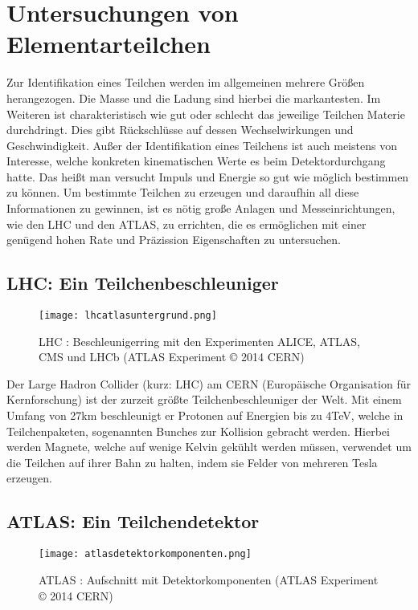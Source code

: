 \documentclass[
a4paper,                                %
twoside,                                %
BCOR1.4cm,                      %
ngerman,                                %
10pt,                           %
headings=normal,                %
headsepline,                    %
clearplainpage, %
final,                                  %
div=14,
parskip=full
]{scrbook}
\begin{document}
\newpage

\chapter{Untersuchungen von Elementarteilchen}

Zur Identifikation eines Teilchen werden im allgemeinen mehrere Gr\"o\ss en herangezogen. Die Masse und die Ladung sind hierbei die markantesten. Im Weiteren ist charakteristisch wie gut oder schlecht das jeweilige Teilchen Materie durchdringt. Dies gibt R\"uckschl\"usse auf dessen Wechselwirkungen und Geschwindigkeit.
Au\ss er der Identifikation eines Teilchens ist auch meistens von Interesse, welche konkreten kinematischen Werte es beim Detektordurchgang hatte. Das hei\ss t man versucht Impuls und Energie so gut wie m\"oglich bestimmen zu k\"onnen. 
Um bestimmte Teilchen zu erzeugen und daraufhin all diese Informationen zu gewinnen, ist es n\"otig gro\ss e Anlagen und Messeinrichtungen, wie den LHC und den ATLAS, zu errichten, die es erm\"oglichen mit einer gen\"ugend hohen Rate und Pr\"azission Eigenschaften zu untersuchen.

\section{LHC: Ein Teilchenbeschleuniger}

\begin{figure}[h]
	\texttt{[image: lhcatlasuntergrund.png]}
	\caption{LHC : Beschleunigerring mit den Experimenten ALICE, ATLAS, CMS und LHCb (ATLAS Experiment © 2014 CERN)}
\end{figure}

Der Large Hadron Collider (kurz: LHC) am CERN (Europ\"aische Organisation für Kernforschung) ist der zurzeit gr\"o\ss te Teilchenbeschleuniger der Welt. Mit einem Umfang von 27\;km beschleunigt er Protonen auf Energien bis zu 4\;TeV, welche in Teilchenpaketen, sogenannten Bunches zur Kollision gebracht werden. Hierbei werden Magnete, welche auf wenige Kelvin gek\"uhlt werden m\"ussen, verwendet um die Teilchen auf ihrer Bahn zu halten, indem sie Felder von mehreren Tesla erzeugen. \cite{Vorlesung} \cite{lhctdr}

\section{ATLAS: Ein Teilchendetektor}

\begin{figure}[h]
	\texttt{[image: atlasdetektorkomponenten.png]}
	\caption{ATLAS : Aufschnitt mit Detektorkomponenten (ATLAS Experiment © 2014 CERN)}
\end{figure}
\end{document}
